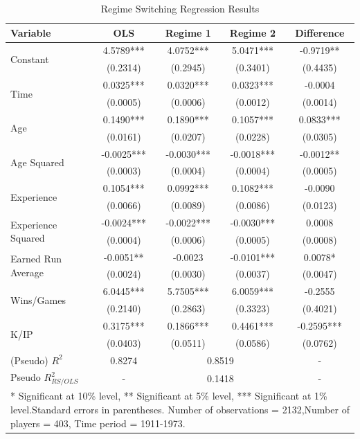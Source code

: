 \documentclass[12pt]{article}
\begin{document}
\begin{table}\caption{Regime Switching Regression Results}\label{tb:results}
\begin{center}
\begin{tabular}{l|c|cc|c} 
 Variable & OLS & Regime 1 & Regime 2 & Difference \\ \hline 
 \multirow{2}{*}{Constant} & 4.5789*** & 4.0752*** & 5.0471*** & -0.9719** \\ 
 & (0.2314) & (0.2945) & (0.3401) & (0.4435) \\ [0.4pc]
 \multirow{2}{*}{Time} & 0.0325*** & 0.0320*** & 0.0323*** & -0.0004  \\ 
 & (0.0005) & (0.0006) & (0.0012) & (0.0014) \\ [0.4pc]
 \multirow{2}{*}{Age} & 0.1490*** & 0.1890*** & 0.1057*** & 0.0833*** \\ 
 & (0.0161) & (0.0207) & (0.0228) & (0.0305) \\ [0.4pc]
 \multirow{2}{*}{Age Squared} & -0.0025*** & -0.0030*** & -0.0018*** & -0.0012** \\ 
 & (0.0003) & (0.0004) & (0.0004) & (0.0005) \\ [0.4pc]
 \multirow{2}{*}{Experience} & 0.1054*** & 0.0992*** & 0.1082*** & -0.0090  \\ 
 & (0.0066) & (0.0089) & (0.0086) & (0.0123) \\ [0.4pc]
 \multirow{2}{*}{Experience Squared} & -0.0024*** & -0.0022*** & -0.0030*** & 0.0008  \\ 
 & (0.0004) & (0.0006) & (0.0005) & (0.0008) \\ [0.4pc]
 \multirow{2}{*}{Earned Run Average} & -0.0051** & -0.0023  & -0.0101*** & 0.0078* \\ 
 & (0.0024) & (0.0030) & (0.0037) & (0.0047) \\ [0.4pc]
 \multirow{2}{*}{Wins/Games} & 6.0445*** & 5.7505*** & 6.0059*** & -0.2555  \\ 
 & (0.2140) & (0.2863) & (0.3323) & (0.4021) \\ [0.4pc]
 \multirow{2}{*}{K/IP} & 0.3175*** & 0.1866*** & 0.4461*** & -0.2595*** \\ 
 & (0.0403) & (0.0511) & (0.0586) & (0.0762) \\ [0.4pc]\hline 
(Pseudo) $R^2$ & 0.8274 & \multicolumn{2}{c|}{0.8519} & - \\ 
Pseudo $R_{RS/OLS}^2$ & - & \multicolumn{2}{c|}{0.1418} & - \\ \hline
\multicolumn{5}{p{5in}}{\footnotesize{* Significant at 10\% level, ** Significant at 5\% level, *** Significant at 1\% level.\newline Standard errors in parentheses.  Number of observations = 2132,\newline Number of players = 403, Time period = 1911-1973.}}
\end{tabular}
\end{center}
\end{table}
\end{document}
